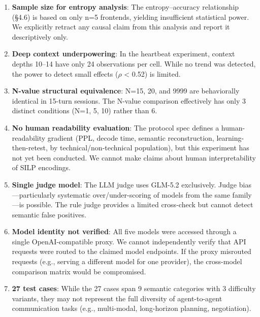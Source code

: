 \documentclass{article}
\begin{document}
\begin{enumerate}


\item

  \textbf{Sample size for entropy analysis}: The entropy--accuracy relationship (\S4.6) is based on only n=5 frontends, yielding insufficient statistical power. We explicitly retract any causal claim from this analysis and report it descriptively only.

\item

  \textbf{Deep context underpowering}: In the heartbeat experiment, context depths 10--14 have only 24 observations per cell. While no trend was detected, the power to detect small effects (\textbar $\rho$\textbar{} < 0.52) is limited.

\item

  \textbf{N-value structural equivalence}: N=15, 20, and 9999 are behaviorally identical in 15-turn sessions. The N-value comparison effectively has only 3 distinct conditions (N=1, 5, 10) rather than 6.

\item

  \textbf{No human readability evaluation}: The protocol spec defines a human-readability gradient (PPL, decode time, semantic reconstruction, learning-then-retest, by technical/non-technical population), but this experiment has not yet been conducted. We cannot make claims about human interpretability of SILP encodings.

\item

  \textbf{Single judge model}: The LLM judge uses GLM-5.2 exclusively. Judge bias---particularly systematic over/under-scoring of models from the same family---is possible. The rule judge provides a limited cross-check but cannot detect semantic false positives.

\item

  \textbf{Model identity not verified}: All five models were accessed through a single OpenAI-compatible proxy. We cannot independently verify that API requests were routed to the claimed model endpoints. If the proxy misrouted requests (e.g., serving a different model for one provider), the cross-model comparison matrix would be compromised.

\item

  \textbf{27 test cases}: While the 27 cases span 9 semantic categories with 3 difficulty variants, they may not represent the full diversity of agent-to-agent communication tasks (e.g., multi-modal, long-horizon planning, negotiation).


\end{enumerate}
\end{document}
